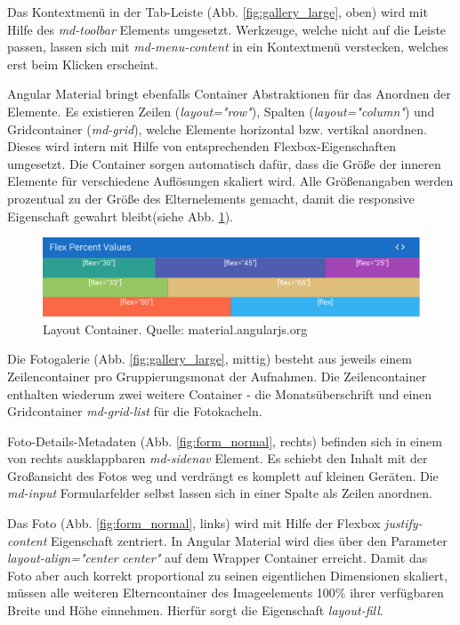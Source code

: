 Das Kontextmenü in der Tab-Leiste (Abb. \ref{fig:gallery_large}, oben) wird mit Hilfe des \emph{md-toolbar} Elements umgesetzt. Werkzeuge, welche nicht auf die Leiste passen, lassen sich mit \emph{md-menu-content} in ein Kontextmenü verstecken, welches erst beim Klicken erscheint.

Angular Material bringt ebenfalls Container Abstraktionen für das Anordnen der Elemente. Es existieren Zeilen (\emph{layout="row"}), Spalten (\emph{layout="column"}) und Gridcontainer (\emph{md-grid}), welche Elemente horizontal bzw. vertikal anordnen. Dieses wird intern  mit Hilfe von entsprechenden Flexbox-Eigenschaften umgesetzt. Die Container sorgen automatisch dafür, dass die Größe der inneren Elemente für verschiedene Auflösungen skaliert wird. Alle Größenangaben werden prozentual zu der Größe des Elternelements gemacht, damit die responsive Eigenschaft gewahrt bleibt(siehe Abb. \ref{fig:layout_container}).

\begin{figure}[htp]     %
\centering
\includegraphics[width=1.0\textwidth]{images/layout_container}
\caption{Layout Container. Quelle: material.angularjs.org}\label{fig:layout_container}
\end{figure}

Die Fotogalerie (Abb. \ref{fig:gallery_large}, mittig) besteht aus jeweils einem Zeilencontainer pro Gruppierungsmonat der Aufnahmen. Die Zeilencontainer enthalten wiederum zwei weitere Container - die Monatsüberschrift und einen Gridcontainer \emph{md-grid-list} für die Fotokacheln.

Foto-Details-Metadaten (Abb. \ref{fig:form_normal}, rechts) befinden sich in einem von rechts ausklappbaren \emph{md-sidenav} Element. Es schiebt den Inhalt mit der Großansicht des Fotos weg und verdrängt es komplett auf kleinen Geräten. Die \emph{md-input} Formularfelder selbst lassen sich in einer Spalte als Zeilen anordnen.

Das Foto (Abb. \ref{fig:form_normal}, links) wird mit Hilfe der Flexbox \emph{justify-content} Eigenschaft zentriert. In Angular Material wird dies über den Parameter \emph{layout-align="center center"} auf dem Wrapper Container erreicht. Damit das Foto aber auch korrekt proportional zu seinen eigentlichen Dimensionen skaliert, müssen alle weiteren Elterncontainer des Imageelements 100\% ihrer verfügbaren Breite und Höhe einnehmen. Hierfür sorgt die Eigenschaft \emph{layout-fill}.

